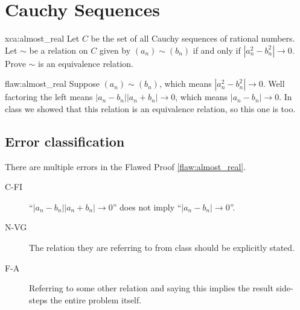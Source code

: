 \section{Cauchy Sequences}

\begin{xca}{xca:almost_real}
Let $C$ be the set of all Cauchy sequences of rational numbers. Let $\sim$ be a relation on $C$ given by $(a_n) \sim (b_n)$ if and only if $|a^2_n - b^2_n| \to 0$. Prove $\sim$ is an equivalence relation.
\end{xca}

\begin{flaw}{flaw:almost_real} %
Suppose $(a_n) \sim (b_n)$, which means $|a^2_n - b^2_n| \to 0$. Well factoring the left means $|a_n - b_n||a_n+b_n| \to 0$, which means $|a_n - b_n| \to 0$. In class we showed that this relation is an equivalence relation, so this one is too.

\end{flaw}

\clearpage
\subsection{Error classification}


There are multiple errors
 in the Flawed Proof \ref{flaw:almost_real}.

 \begin{description}
    \item[C-FI] ``$|a_n - b_n||a_n+b_n| \to 0$'' does not imply ``$|a_n - b_n| \to 0$''.
    \item[N-VG] The relation they are referring to from class should be explicitly stated.
    \item[F-A] Referring to some other relation and saying this implies the result side-steps the entire problem itself.



 	
 \end{description}


